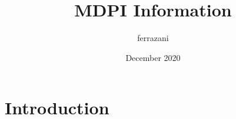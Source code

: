\documentclass{article}
\title{MDPI Information}
\author{ferrazani }
\date{December 2020}
\begin{document}
\maketitle

\section{Introduction}
\end{document}
